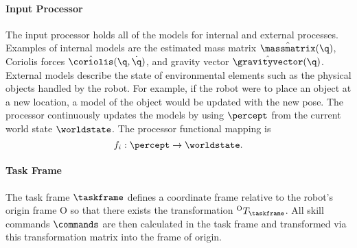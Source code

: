 \paragraph{Input Processor}
The input processor holds all of the models for internal and external processes. Examples of internal models are the estimated mass matrix $\hat{\massmatrix}(\q)$, Coriolis forces $\hat{\coriolis}(\q,\dot{\q})$, and gravity vector $\hat{\gravityvector}(\q)$. External models describe the state of environmental elements such as the physical objects handled by the robot.
For example, if the robot were to place an object at a new location, a model of the object would be updated with the new pose.
The processor continuously updates the models by using $\percept$ from the current world state $\worldstate$.
The processor functional mapping is 
\begin{equation}
f_i: \percept \rightarrow \worldstate.
\end{equation}

\paragraph{Task Frame}

The task frame $\taskframe$ defines a coordinate frame relative to the robot's origin frame O so that there exists the transformation ${}^\text{O}T_\taskframe$.
All skill commands $\commands$ are then calculated in the task frame and transformed via this transformation matrix into the frame of origin.